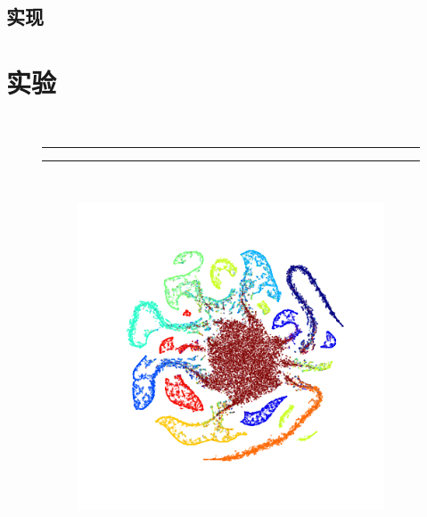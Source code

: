 \documentclass[12pt]{article}
\begin{document}
\subsection{实现}



\section{实验}

\begin{figure}[t]
    \centering
      \\
    \noindent \hspace*{5mm}  \rule{5cm}{0.5pt} \hspace{7mm} \rule{5cm}{0.5pt}
    \\
    \begin{subfigure}{.18\textwidth}
      \centering
      \includegraphics[width=\linewidth]{images/tsne/tsne_ROG_imagenet32.png}

\end{subfigure}
\end{figure}
\end{document}
